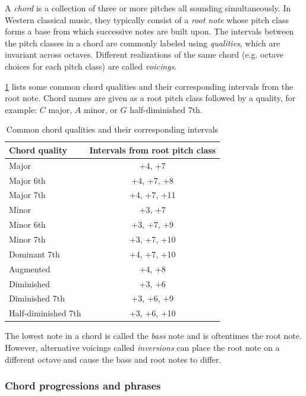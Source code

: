 A \emph{chord} is a collection of three or more pitches all sounding
simultaneously\citep{randel1999harvard}. In Western classical music, they
typically consist of a \emph{root note} whose pitch class forms a base from
which successive notes are built upon. The intervals between the pitch classes
in a chord are commonly labeled using \emph{qualities}, which are invariant
across octaves. Different realizations of the same chord (e.g. octave choices
for each pitch class) are called \emph{voicings}.

\cref{tab:chord-qualities} lists some common chord qualities and their
corresponding intervals from the root note. Chord names are given as a root
pitch class followed by a quality, for example: $C$ major, $A$ minor, or $G$
half-diminished $7$th.

\begin{table}[htpb]
    \centering
    \begin{tabular}{lc}
        \toprule
        Chord quality & Intervals from root pitch class \\
        \midrule
        Major & +4, +7 \\
        Major 6th & +4, +7, +8 \\
        Major 7th & +4, +7, +11 \\
        Minor & +3, +7 \\
        Minor 6th & +3, +7, +9 \\
        Minor 7th & +3, +7, +10 \\
        Dominant 7th & +4, +7, +10 \\
        Augmented & +4, +8 \\
        Diminished & +3, +6 \\
        Diminished 7th & +3, +6, +9 \\
        Half-diminished 7th & +3, +6, +10 \\
        \bottomrule
    \end{tabular}
    \caption{Common chord qualities and their corresponding intervals\citep{freedman2015correlational}}
    \label{tab:chord-qualities}
\end{table}

The lowest note in a chord is called the \emph{bass} note and is oftentimes the
root note. However, alternative voicings called \emph{inversions} can place the
root note on a different octave and cause the bass and root notes to
differ.

\subsubsection{Chord progressions and phrases}

